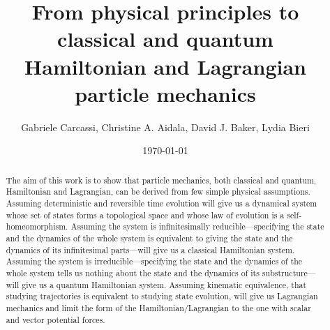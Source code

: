 \documentclass[smallextended]{svjour3}
\numberwithin{equation}{section}
\theoremstyle{definition}
\newcommand{\journal}[1]{\ifjournal#1\fi}
\begin{document}
\title{From physical principles to classical and quantum \\ Hamiltonian and Lagrangian particle mechanics}
\author{Gabriele Carcassi, Christine A. Aidala, David J. Baker, Lydia Bieri}

\ifjournal
\else
\fi

\ifjournal
\fi

\date{\today}

\journal{\maketitle}
	
\begin{abstract}
The aim of this work is to show that particle mechanics, both classical and quantum, Hamiltonian and Lagrangian, can be derived from few simple physical assumptions. Assuming deterministic and reversible time evolution will give us a dynamical system whose set of states forms a topological space and whose law of evolution is a self-homeomorphism. Assuming the system is infinitesimally reducible---specifying the state and the dynamics of the whole system is equivalent to giving the state and the dynamics of its infinitesimal parts---will give us a classical Hamiltonian system. Assuming the system is irreducible---specifying the state and the dynamics of the whole system tells us nothing about the state and the dynamics of its substructure---will give us a quantum Hamiltonian system. Assuming kinematic equivalence, that studying trajectories is equivalent to studying state evolution, will give us Lagrangian mechanics and limit the form of the Hamiltonian/Lagrangian to the one with scalar and vector potential forces.
\end{abstract}
\end{document}
